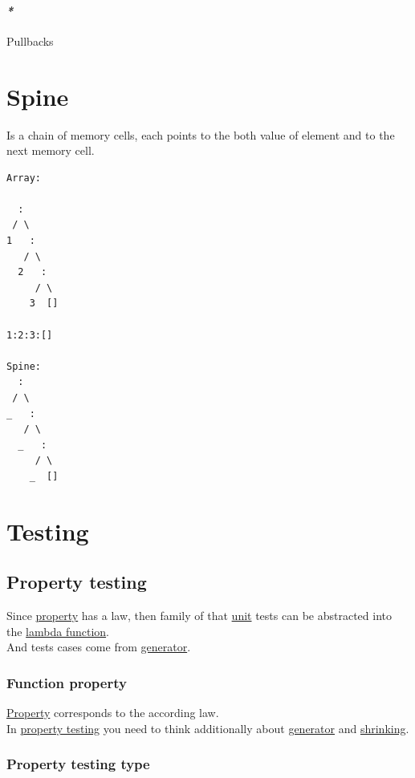 \documentclass[a4paper,14pt,oneside]{book}
\begin{document}
\subsubsection{\emph{*}}
\label{sec:orgafaac09}
\label{org0a800c9}Pullbacks\\

\chapter{\label{org17871e4}Spine}
\label{sec:org84d0055}
Is a chain of memory cells, each points to the both value of element and to the next memory cell.\\
\begin{verbatim}
Array:

  :
 / \
1   :
   / \
  2   :
     / \
    3  []

1:2:3:[]

Spine:
  :
 / \
_   :
   / \
  _   :
     / \
    _  []

\end{verbatim}

\chapter{\label{org8612152}Testing}
\label{sec:orgd0f4714}
\section{\label{orgefdfbf0}Property testing}
\label{sec:orgbe51e3d}
Since \hyperref[orgfdc5558]{property} has a law, then family of that \hyperref[org2f67cc5]{unit} tests can be abstracted into the \hyperref[orgb9478bf]{lambda function}.\\
And tests cases come from \hyperref[orgd1703d9]{generator}.\\

\subsection{\label{org0a57ba7}Function property}
\label{sec:org61c6ca4}
\hyperref[orgfdc5558]{Property} corresponds to the according law.\\
In \hyperref[orgefdfbf0]{property testing} you need to think additionally about \hyperref[orgd1703d9]{generator} and \hyperref[org3016036]{shrinking}.\\

\subsection{\label{org32b0a17}Property testing type}
\label{sec:orge358a65}
\end{document}
